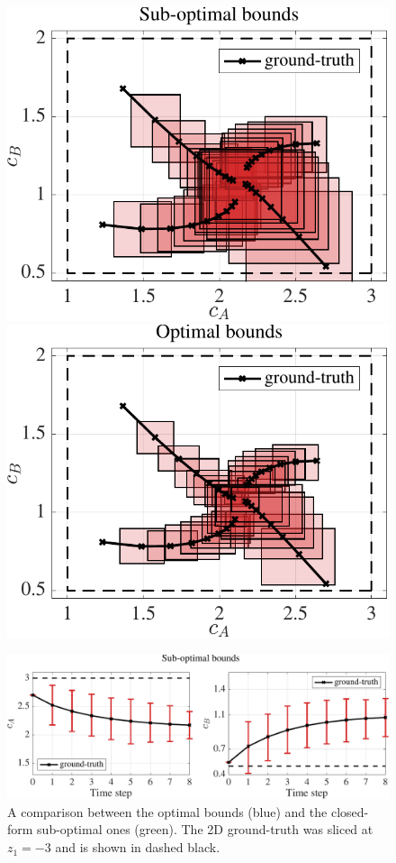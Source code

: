 \begin{figure}[t]
	\centering
	\includegraphics[scale=0.4]{../images/chap2_numex_ex3_phase_subopt.pdf} \hspace{5pt}
	\includegraphics[scale=0.4]{../images/chap2_numex_ex3_phase_opt.pdf} 
	\caption{A comparison between the optimal bounds (blue) and the closed-form sub-optimal ones (green). The 2D ground-truth was sliced at $z_1 = -3$ and is shown in dashed black.}
	\label{fig:ex3_phase}
	\vspace{15pt}
	\includegraphics[scale=0.4]{../images/chap2_numex_ex3_time_subopt.pdf} \hspace{5pt}

\end{figure}
